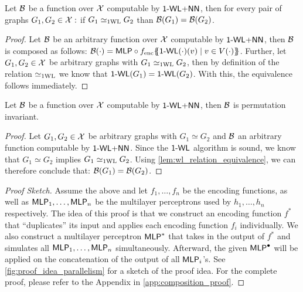 \begin{lemma}\label{lem:wl_relation_equivalence}
    Let $\mathcal{B}$ be a function over $\mathcal{X}$ computable by $\textsf{1-WL+NN}$, then for every pair of graphs $G_1, G_2 \in \mathcal{X}:$ if $G_1 \simeq_{\text{1WL}} G_2$ than $\mathcal{B}(G_1) = \mathcal{B}(G_2)$.
\end{lemma}

\begin{proof}
    Let $\mathcal{B}$ be an arbitrary function over $\mathcal{X}$ computable by $\textsf{1-WL+NN}$, then $\mathcal{B}$ is composed as follows: $\mathcal{B}(\cdot) = \textsf{MLP} \circ f_{\text{enc}} \{\!\!\{ \textsf{1-WL}(\cdot)(v) \mid v \in V(\cdot) \}\!\!\}$. Further, let $G_1, G_2 \in \mathcal{X}$ be arbitrary graphs with $G_1 \simeq_{\text{1WL}} G_2$, then by definition of the relation $\simeq_{\text{1WL}}$ we know that $\textsf{1-WL}(G_1) = \textsf{1-WL}(G_2)$. With this, the equivalence follows immediately.
\end{proof}

\begin{lemma}\label{lem:wlnn_permutation_invariance}
    Let $\mathcal{B}$ be a function over $\mathcal{X}$ computable by $\textsf{1-WL+NN}$, then $\mathcal{B}$ is permutation invariant.
\end{lemma}

\begin{proof}
    Let $G_1, G_2 \in \mathcal{X}$ be arbitrary graphs with $G_1 \simeq G_2$ and $\mathcal{B}$ an arbitrary function computable by $\textsf{1-WL+NN}$. Since the $\textsf{1-WL}$ algorithm is sound, we know that $G_1 \simeq G_2$ implies $G_1 \simeq_{\text{1WL}} G_2$. Using \autoref{lem:wl_relation_equivalence}, we can therefore conclude that: $\mathcal{B}(G_1) = \mathcal{B}(G_2)$.
\end{proof}

\begin{proof}[Proof Sketch]\renewcommand{\qedsymbol}{}
    Assume the above and let $f_{1}, \ldots, f_{n}$ be the encoding functions, as well as $\textsf{MLP}_1, \ldots, \textsf{MLP}_n$ be the multilayer perceptrons used by $h_1, \dots, h_n$ respectively. The idea of this proof is that we construct an encoding function $f^*$ that ``duplicates'' its input and applies each encoding function $f_i$ individually. We also construct a multilayer perceptron $\textsf{MLP}^*$ that takes in the output of $f^*$ and simulates all $\textsf{MLP}_1, \ldots, \textsf{MLP}_n$ simultaneously. Afterward, the given $\textsf{MLP}^\bullet$ will be applied on the concatenation of the output of all $\textsf{MLP}_i$'s. See \autoref{fig:proof_idea_parallelism} for a sketch of the proof idea. For the complete proof, please refer to the Appendix in \autoref{app:composition_proof}.
\end{proof}

